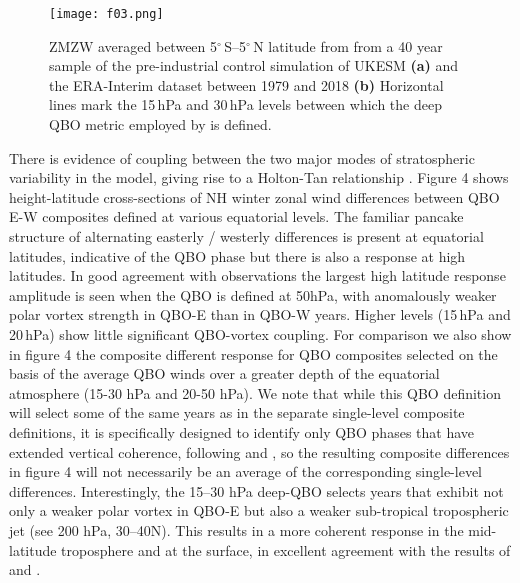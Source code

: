
\begin{center}
\begin{figure}[h!]
\noindent\texttt{[image: f03.png]}
\caption{ZMZW averaged between 5$^{\circ}$\,S--5$^{\circ}$\,N latitude from from a 40 year sample of the pre-industrial control simulation of UKESM \textbf{(a)} and the ERA-Interim dataset between 1979 and 2018 \textbf{(b)} Horizontal lines mark the 15\,hPa and 30\,hPa levels between which the deep QBO metric employed by \cite{Andrews2019} is defined.}
\label{fig1}
\end{figure}
\end{center}



There is evidence of coupling between the two major modes of stratospheric variability in the model, giving rise to a Holton-Tan relationship \citep{Anstey20}. Figure 4 shows height-latitude cross-sections of NH winter zonal wind differences between QBO E-W composites defined at various equatorial levels. The familiar pancake structure of alternating easterly / westerly differences is present at equatorial latitudes, indicative of the QBO phase but there is also a response at high latitudes. In good agreement with observations the largest high latitude response amplitude is seen when  the QBO is defined at 50hPa, with anomalously weaker polar vortex strength in QBO-E than in QBO-W years. Higher levels (15\,hPa and 20\,hPa) show little significant QBO-vortex coupling. For comparison we also show in figure 4 the composite different response for QBO composites selected on the basis of the average QBO winds over a greater depth of the equatorial atmosphere (15-30 hPa and 20-50 hPa). We note that while this QBO definition will select some of the same years as in the separate single-level composite definitions, it is specifically designed to identify only QBO  phases that have extended vertical coherence, following \citep{Gray2018} and \cite{Andrews2019}, so the resulting composite  differences in figure 4 will not necessarily be an average of the corresponding single-level differences.   Interestingly, the 15--30 hPa deep-QBO selects years that exhibit not only a weaker polar vortex in QBO-E but also a weaker sub-tropical tropospheric jet (see 200 hPa, 30--40N). This results in a more coherent response in the mid-latitude troposphere and at the surface, in excellent agreement with the results of \cite{Gray2018} and \cite{Andrews2019}. 

